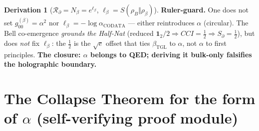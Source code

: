 \documentclass[11pt]{article}
\newcommand{\bTGL}{\beta_{\mathrm{TGL}}}\newcommand{\Msun}{M_{\odot}}\newcommand{\TGL}{\mathrm{TGL}}
\theoremstyle{definition}\newtheorem{deriv}{Derivation}
\begin{document}
\begin{deriv}[$\mathcal{R}_\partial=N_\beta=e^{\ell_\beta}$, $\ell_\beta=S(\rho_B\Vert\rho_\beta)$]
\textbf{Ruler-guard.} One does not set $g_{00}^{(\beta)}=\alpha^2$ nor $\ell_\beta=-\log\alpha_{\mathrm{CODATA}}$ --- either reintroduces $\alpha$ (circular). The Bell co-emergence \emph{grounds the Half-Nat} (reduced $\mathbf 1_2/2\Rightarrow CCI=\tfrac12\Rightarrow S_\partial=\tfrac12$), but does \emph{not} fix $\ell_\beta$: the $\tfrac12$ is the $\sqrt e$ offset that ties $\bTGL$ to $\alpha$, not $\alpha$ to first principles. \textbf{The closure: $\alpha$ belongs to QED; deriving it bulk-only falsifies the holographic boundary.}\end{deriv}

\section{The Collapse Theorem for the form of $\alpha$ (self-verifying proof module)}\label{sec:collapse-form}
\end{document}
